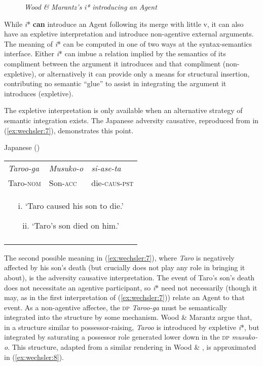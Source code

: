 \documentclass[output=paper]{langscibook}
\begin{document}
 


\begin{figure}
\caption{\textit{Wood} \textit{\&} \textit{Marantz’s} \textit{i*} \textit{introducing} \textit{an} \textit{Agent}} 
\label{fig:wechsler:1}
\end{figure}

While \textit{i}* \textbf{can} introduce an Agent following its merge with little v, it can also have an expletive interpretation and introduce non-agentive external arguments. The meaning of \textit{i}* can be computed in one of two ways at the syntax-semantics interface. Either \textit{i}* can imbue a relation implied by the semantics of its compliment between the argument it introduces and that compliment (non-expletive), or alternatively it can provide only a means for structural insertion, contributing no semantic “glue” to assist in integrating the argument it introduces (expletive). 

The expletive interpretation is only available when an alternative strategy of semantic integration exists. The Japanese adversity causative, reproduced from \citeauthor{WoodMarantz2017} in (\ref{ex:wechsler:7}), demonstrates this point. 

\ea\label{ex:wechsler:7}
Japanese (\citealt[274]{WoodMarantz2017})\\

\tablefirsthead{}

\tabletail{}
\tablelasttail{}
\begin{tabularx}{\textwidth}{XXX}
\lsptoprule
\textit{Taroo-ga} & \textit{Musuko-o} & \textit{si-ase-ta}\\
Taro-\textsc{nom} & Son-\textsc{acc} & die-\textsc{caus-pst}\\
\multicolumn{3}{c}{i. ‘Taro caused his son to die.’

ii. ‘Taro’s son died on him.’}\\
\lspbottomrule
\end{tabularx}
\z

The second possible meaning in (\ref{ex:wechsler:7}), where \textit{Taro} is negatively affected by his son’s death (but crucially does not play any role in bringing it about), is the adversity causative interpretation. The event of Taro’s son’s death does not necessitate an agentive participant, so \textit{i}* need not necessarily (though it may, as in the first interpretation of (\ref{ex:wechsler:7})) relate an Agent to that event. As a non-agentive affectee, the \textsc{dp} \textit{Taroo-ga} must be semantically integrated into the structure by some mechanism. Wood \& Marantz argue that, in a structure similar to possessor-raising, \textit{Taroo} is introduced by expletive \textit{i}*, but integrated by saturating a possessor role generated lower down in the \textsc{dp} \textit{musuko-o}. This structure, adapted from a similar rendering in Wood \& \citet[274]{Marantz2017}, is approximated in (\ref{ex:wechsler:8}).
\end{document}
